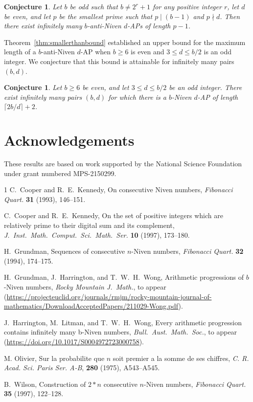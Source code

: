 \documentclass[12pt]{article}
\newtheorem{conjecture}[theorem]{Conjecture}
\theoremstyle{definition}
\begin{document}
\begin{conjecture}\label{con:c15}
Let $b$ be odd such that $b\neq2^r+1$ for any positive integer $r$, let $d$ be even, and let $p$ be the smallest prime such that $p\mid(b-1)$ and $p\nmid d$. Then there exist infinitely many $b$-anti-Niven $d$-APs of length $p-1$.
\end{conjecture}

Theorem~\ref{thm:smallerthanbound} established an upper bound for the maximum length of a $b$-anti-Niven $d$-AP when $b\geq 6$ is even and $3\leq d\leq b/2$ is an odd integer.  We conjecture that this bound is attainable for infinitely many pairs $(b,d)$.

\begin{conjecture}\label{con:c07}
    Let $b\geq6$ be even, and let $3\leq d\leq b/2$ be an odd integer. There exist infinitely many pairs $(b,d)$ for which there is a $b$-Niven $d$-AP of length $\lceil2b/d\rceil+2$.
\end{conjecture}





\section{Acknowledgements}

These results are based on work supported by the National Science Foundation under grant numbered MPS-2150299.


\begin{thebibliography}{1}
C.~Cooper and R.~E.~Kennedy, On consecutive Niven numbers, \textit{Fibonacci Quart.\/} \textbf{31} (1993), 146--151.

C.~Cooper and R.~E.~Kennedy, On the set of positive integers which are relatively prime to their digital sum and its complement, \textit{J.\ Inst.\ Math.\ Comput.\ Sci.\ Math.\ Ser.\/} \textbf{10} (1997), 173--180.

H.~Grundman, Sequences of consecutive $n$-Niven numbers, \textit{Fibonacci Quart.\/} \textbf{32} (1994), 174--175.

H.~Grundman, J.~Harrington, and T.~W.~H.~Wong, Arithmetic progressions of $b$-Niven numbers, \textit{Rocky Mountain J.\ Math.\/}, to appear (\url{https://projecteuclid.org/journals/rmjm/rocky-mountain-journal-of-mathematics/DownloadAcceptedPapers/211029-Wong.pdf}).

J.~Harrington, M.~Litman, and T.~W.~H.~Wong, Every arithmetic progression contains infinitely many
b-Niven numbers, \textit{Bull.\ Aust.\ Math.\ Soc.\/}, to appear (\url{https://doi.org/10.1017/S0004972723000758}).

M. Olivier, Sur la probabilite que $n$ soit premier a la somme de ses chiffres, \textit{C. R. Acad. Sci. Paris Ser. A-B}, \textbf{280} (1975), A543--A545.

B.~Wilson, Construction of $2*n$ consecutive $n$-Niven numbers, \textit{Fibonacci Quart.\/} \textbf{35} (1997), 122--128.

\end{thebibliography}
\end{document}
